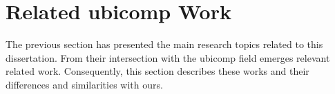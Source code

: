 \section{Related \acl{ubicomp} Work}
\label{sec:soa_ubicomp}

The previous section has presented the main research topics related to this dissertation.
From their intersection with the \ac{ubicomp} field emerges relevant related work.
Consequently, this section describes these works and their differences and similarities with ours.




